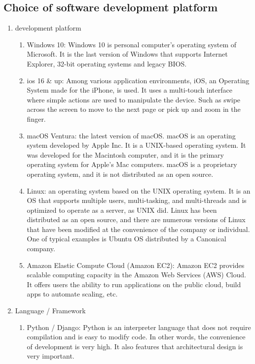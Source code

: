 \documentclass[conference]{IEEEtran}
\begin{document}
\subsection{Choice of software development platform}
\begin{enumerate}
    \item development platform
    \begin{enumerate}
        \item Windows 10:
        Windows 10 is personal computer’s operating system of Microsoft. It is the last version of Windows that supports Internet Explorer, 32-bit operating systems and legacy BIOS.
        \item ios 16 \& up:
        Among various application environments, iOS, an Operating System made for the iPhone, is used. It uses a multi-touch interface where simple actions are used to manipulate the device. Such as swipe across the screen to move to the next page or pick up and zoom in the finger.
        \item macOS Ventura:
        the latest version of macOS. macOS is an operating system developed by Apple Inc. It is a UNIX-based operating system. It was developed for the Macintosh computer, and it is the primary operating system for Apple's Mac computers. macOS is a proprietary operating system, and it is not distributed as an open source.
        \item Linux:
        an operating system based on the UNIX operating system. It is an OS that supports multiple users, multi-tasking, and multi-threads and is optimized to operate as a server, as UNIX did. Linux has been distributed as an open source, and there are numerous versions of Linux that have been modified at the convenience of the company or individual. One of typical examples is Ubuntu OS distributed by a Canonical company.
        \item Amazon Elastic Compute Cloud (Amazon EC2):
        Amazon EC2 provides scalable computing capacity in the Amazon Web Services (AWS) Cloud. It offers users the ability to run applications on the public cloud, build apps to automate scaling, etc.
    \end{enumerate}
    \item Language / Framework
    \begin{enumerate}
        \item Python / Django:
        Python is an interpreter language that does not require compilation and is easy to modify code. In other words, the convenience of development is very high. It also features that architectural design is very important. \hfill \break

\end{enumerate}
\end{enumerate}
\end{document}

